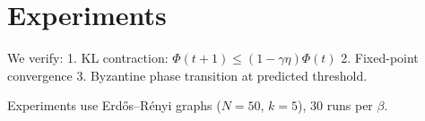 \section{Experiments}

We verify:
1. KL contraction: \(\Phi(t+1) \le (1 - \gamma\eta) \Phi(t)\)
2. Fixed-point convergence
3. Byzantine phase transition at predicted threshold.

Experiments use Erdős–Rényi graphs (\(N=50\), \(k=5\)), 30 runs per \(\beta\).
